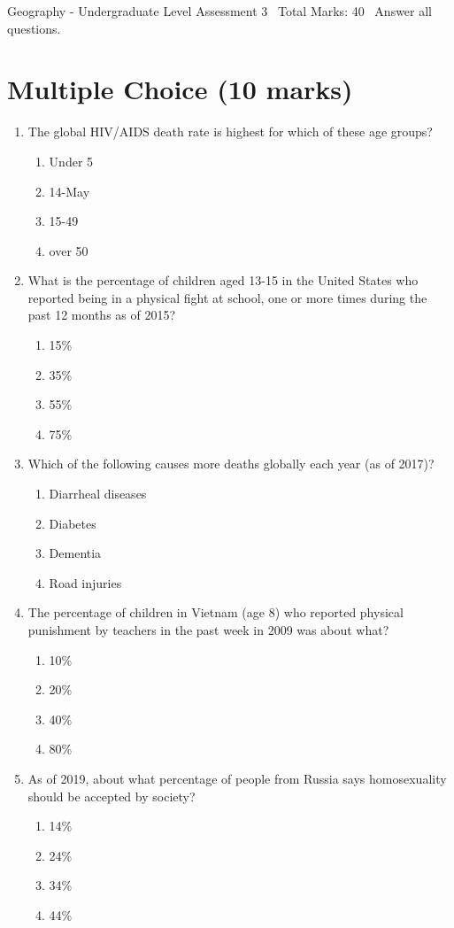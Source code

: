 \documentclass[12pt]{article}
\begin{document}
\begin{center}
Geography - Undergraduate Level Assessment 3 \
Total Marks: 40 \
Answer all questions.
\end{center}

\section*{Multiple Choice (10 marks)}
\begin{enumerate}[label=\arabic*.]
\item The global HIV/AIDS death rate is highest for which of these age groups?
\begin{enumerate}[label=(\alph*)]
    \item Under 5
    \item 14-May
    \item 15-49
    \item over 50
\end{enumerate}
\item What is the percentage of children aged 13-15 in the United States who reported being in a physical fight at school, one or more times during the past 12 months as of 2015?
\begin{enumerate}[label=(\alph*)]
    \item 15\%
    \item 35\%
    \item 55\%
    \item 75\%
\end{enumerate}
\item Which of the following causes more deaths globally each year (as of 2017)?
\begin{enumerate}[label=(\alph*)]
    \item Diarrheal diseases
    \item Diabetes
    \item Dementia
    \item Road injuries
\end{enumerate}
\item The percentage of children in Vietnam (age 8) who reported physical punishment by teachers in the past week in 2009 was about what?
\begin{enumerate}[label=(\alph*)]
    \item 10\%
    \item 20\%
    \item 40\%
    \item 80\%
\end{enumerate}
\item As of 2019, about what percentage of people from Russia says homosexuality should be accepted by society?
\begin{enumerate}[label=(\alph*)]
    \item 14\%
    \item 24\%
    \item 34\%
    \item 44\%
\end{enumerate}
\end{enumerate}
\end{document}
